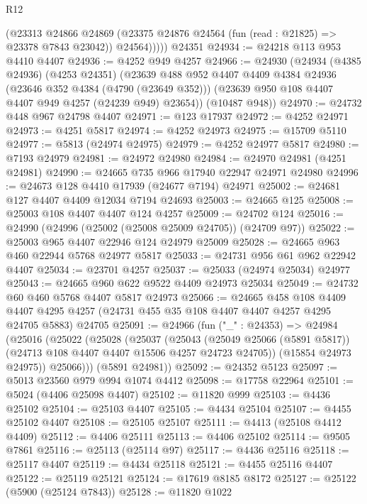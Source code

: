 \begin{lexlean}{R12}
\begin{coremodule}
            (@23313
              @24866
              @24869
              (@23375 @24876 @24564 (fun (read : @21825) => @23378 @7843 @23042))
              @24564)))))
    @24351
@24934 := @24218 @113 @953 @4410 @4407
@24936 := @4252 @949 @4257
@24966 := @24930
    (@24934
      (@4385 @24936)
      (@4253 @24351)
      (@23639
        @488
        @952
        @4407
        @4409
        @4384
        @24936
        (@23646 @352 @4384 (@4790 (@23649 @352)))
        (@23639 @950 @108 @4407 @4407 @949 @4257 (@24239 @949) @23654))
      (@10487 @948))
@24970 := @24732 @448 @967 @24798 @4407
@24971 := @123 @17937
@24972 := @4252 @24971
@24973 := @4251 @5817
@24974 := @4252 @24973
@24975 := @15709 @5110
@24977 := @5813 (@24974 @24975)
@24979 := @4252 @24977 @5817
@24980 := @7193 @24979
@24981 := @24972 @24980
@24984 := @24970 @24981 (@4251 @24981)
@24990 := @24665 @735 @966 @17940 @22947 @24971 @24980
@24996 := @24673 @128 @4410 @17939 (@24677 @7194) @24971
@25002 := @24681 @127 @4407 @4409 @12034 @7194 @24693
@25003 := @24665 @125
@25008 := @25003 @108 @4407 @4407 @124 @4257
@25009 := @24702 @124
@25016 := @24990 (@24996 (@25002 (@25008 @25009 @24705)) (@24709 @97))
@25022 := @25003 @965 @4407 @22946 @124 @24979 @25009
@25028 := @24665 @963 @460 @22944 @5768 @24977 @5817
@25033 := @24731 @956 @61 @962 @22942 @4407
@25034 := @23701 @4257
@25037 := @25033 (@24974 @25034) @24977
@25043 := @24665 @960 @622 @9522 @4409 @24973 @25034
@25049 := @24732 @60 @460 @5768 @4407 @5817 @24973
@25066 := @24665
    @458
    @108
    @4409
    @4407
    @4295
    @4257
    (@24731 @455 @35 @108 @4407 @4407 @4257 @4295 @24705 @5883)
    @24705
@25091 := @24966
    (fun ("_" : @24353) =>
    @24984
      (@25016
        (@25022
          (@25028
            (@25037
              (@25043
                (@25049 @25066 (@5891 @5817))
                (@24713 @108 @4407 @4407 @15506 @4257 @24723 @24705))
              (@15854 @24973 @24975))
            @25066)))
      (@5891 @24981))
@25092 := @24352 @5123
@25097 := @5013 @23560 @979 @994 @1074 @4412
@25098 := @17758 @22964
@25101 := @5024 (@4406 @25098 @4407)
@25102 := @11820 @999
@25103 := @4436 @25102
@25104 := @25103 @4407
@25105 := @4434 @25104
@25107 := @4455 @25102 @4407
@25108 := @25105 @25107
@25111 := @4413 (@25108 @4412 @4409)
@25112 := @4406 @25111
@25113 := @4406 @25102
@25114 := @9505 @7861
@25116 := @25113 (@25114 @97)
@25117 := @4436 @25116
@25118 := @25117 @4407
@25119 := @4434 @25118
@25121 := @4455 @25116 @4407
@25122 := @25119 @25121
@25124 := @17619 @8185 @8172
@25127 := @25122 (@5900 (@25124 @7843))
@25128 := @11820 @1022

\end{coremodule}
\end{lexlean}
